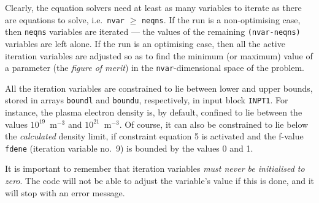 \documentclass[11pt,a4paper]{report}
\begin{document}
Clearly, the equation solvers need at least as many variables to iterate as
there are equations to solve, i.e.\ {\tt nvar} $\geq$ {\tt neqns}. If the run
is a non-optimising case, then {\tt neqns} variables are iterated --- the
values of the remaining {\tt (nvar-neqns)} variables are left alone. If the
run is an optimising case, then all the active iteration variables are
adjusted so as to find the minimum (or maximum) value of a parameter (the {\em
figure of merit}) in the {\tt nvar}-dimensional space of the problem.

All the iteration variables are constrained to lie between lower and upper
bounds, stored in arrays {\tt boundl} and {\tt boundu}, respectively, in input
block {\tt INPT1}. For instance, the plasma electron density is, by default,
confined to lie between the values $10^{19}$~m$^{-3}$ and
$10^{21}$~m$^{-3}$. Of course, it can also be constrained to lie below the
{\em calculated}\/ density limit, if constraint equation 5 is activated and
the f-value {\tt fdene} (iteration variable no.\ 9) is bounded by the values 0
and 1.

It is important to remember that iteration variables {\em must never be
initialised to zero}. The code will not be able to adjust the variable's value
if this is done, and it will stop with an error message.

\end{document}

